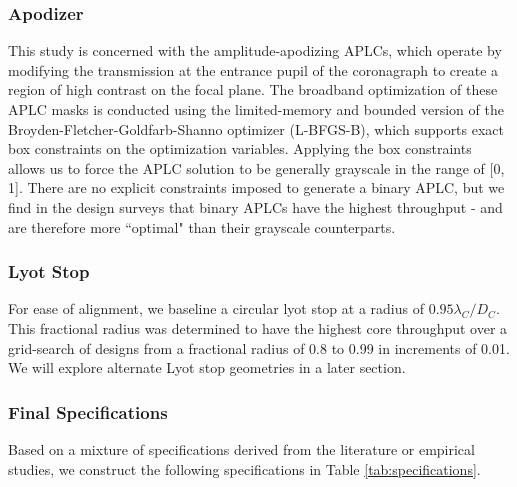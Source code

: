 \documentclass[]{spie}  %
\begin{document}
\subsubsection{Apodizer}
This study is concerned with the amplitude-apodizing APLCs, which operate by modifying the transmission at the entrance pupil of the coronagraph to create a region of high contrast on the focal plane. The broadband optimization of these APLC masks is conducted using the limited-memory and bounded version of the Broyden-Fletcher-Goldfarb-Shanno optimizer (L-BFGS-B), which supports exact box constraints on the optimization variables. Applying the box constraints allows us to force the APLC solution to be generally grayscale in the range of [0, 1]. There are no explicit constraints imposed to generate a binary APLC, but we find in the design surveys that binary APLCs have the highest throughput - and are therefore more ``optimal" than their grayscale counterparts.

\subsubsection{Lyot Stop}
For ease of alignment, we baseline a circular lyot stop at a radius of $0.95 \lambda_C / D_C$. This fractional radius was determined to have the highest core throughput over a grid-search of designs from a fractional radius of 0.8 to 0.99 in increments of 0.01. We will explore alternate Lyot stop geometries in a later section.

\subsubsection{Final Specifications}
Based on a mixture of specifications derived from the literature or empirical studies, we construct the following specifications in Table \ref{tab:specifications}.
\end{document}
